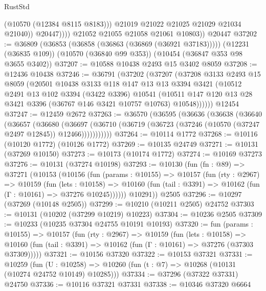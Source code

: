 \begin{lexlean}{RustStd}
\begin{coremodule}
                      (@10570 (@12384 @8115 @8183)))
                    @21019
                    @21022
                    @21025
                    @21029
                    @21034
                    @21040))
                @20447))))
        @21052
        @21055
        @21058
        @21061
        @10803))
    @20447
@37202 := @36809
    (@36853 (@36858 (@36863 (@36869 (@36921 @37183)))))
    (@12231 (@36835 @109))
    (@10570 (@36840 @99 @353))
    (@10454 (@36847 @353 @98 @3655 @3402))
@37207 := @10588 @10438 @2493 @15 @3402 @8059
@37208 := @12436 @10438
@37246 := @36791
    (@37202
      (@37207
        (@37208
          @3133
          @2493
          @15
          @8059
          (@20501
            @10438
            @3133
            @118
            @147
            @13
            @13
            @3394
            @3421
            (@10512
              @2491
              @13
              @102
              @3394
              (@3422 @3396)
              @10541
              (@10511 @147 @120 @13 @28 @3421 @3396 (@36767 @146 @3421 @10757 @10763) @10548))))))
    @12454
@37247 := @12459 @2672
@37263 := @36570
    (@36595
      (@36636
        (@36638
          (@36640
            (@36657
              (@36680
                (@36697
                  (@36710 (@36719 (@36723 (@37246 (@10570 (@37247 @2497 @12845)) @12466)))))))))))
@37264 := @10114 @1772
@37268 := @10116 (@10120 @1772) (@10126 @1772)
@37269 := @10135 @24749
@37271 := @10131 (@37269 @10150)
@37273 := @10173 (@10174 @1772)
@37274 := @10169 @37273
@37276 := @10131 (@37274 @10198)
@37293 := @10130
    (fun (fn : @89) =>
    @37271
      (@10153
        (@10156
          (fun (params : @10155) =>
          @10157
            (fun (rty : @2967) =>
            @10159
              (fun (lets : @10158) =>
              @10160 (fun (tail : @3391) => @10162 (fun (Γ : @10161) => @37276 @10245))))))
        @10291))
    @2505
@37296 := @10297 (@37269 (@10148 @2505))
@37299 := @10210 (@10211 @2505) @24752
@37303 := @10131 (@10202 (@37299 @10219) @10223)
@37304 := @10236 @2505
@37309 := @10233 (@10235 @37304 @24755 @10191 @10193)
@37320 := fun (params : @10155) =>
  @10157
    (fun (rty : @2967) =>
    @10159
      (fun (lets : @10158) =>
      @10160 (fun (tail : @3391) => @10162 (fun (Γ : @10161) => @37276 (@37303 @37309)))))
@37321 := @10156 @37320
@37322 := @10153 @37321
@37331 := @10259
    (fun (U : @10258) => @10260 (fun (t : @7) => @10268 (@10131 (@10274 @24752 @10149) @10285)))
@37334 := @37296 (@37322 @37331) @24750
@37336 := @10116 @37321 @37331
@37338 := @10346 @37320 @6664

\end{coremodule}
\end{lexlean}
